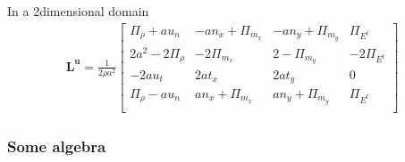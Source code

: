 \documentclass[letterpaper,10pt,english]{jupyterBook}
\begin{document}
\sphinxAtStartPar
In a 2\sphinxhyphen{}dimensional domain
\begin{equation*}
\begin{split}
\mathbf{L}^\mathbf{u} =
\frac{1}{2 \rho a^2}
\begin{bmatrix}
  \Pi_\rho + a u_n & - a n_x + \Pi_{m_x}  & - a n_y + \Pi_{m_y} & \Pi_{E^t} \\
   2 a^2 - 2 \Pi_{\rho} & - 2 \Pi_{m_x} & 2 - \Pi_{m_y} & - 2 \Pi_{E^t} \\
  - 2 a u_t & 2 a t_x & 2 a t_y & 0 \\
  \Pi_\rho - a u_n &   a n_x + \Pi_{m_x}  &   a n_y + \Pi_{m_y} & \Pi_{E^t} \\
\end{bmatrix}
\end{split}
\end{equation*}\subsubsection*{Some algebra}
\end{document}
